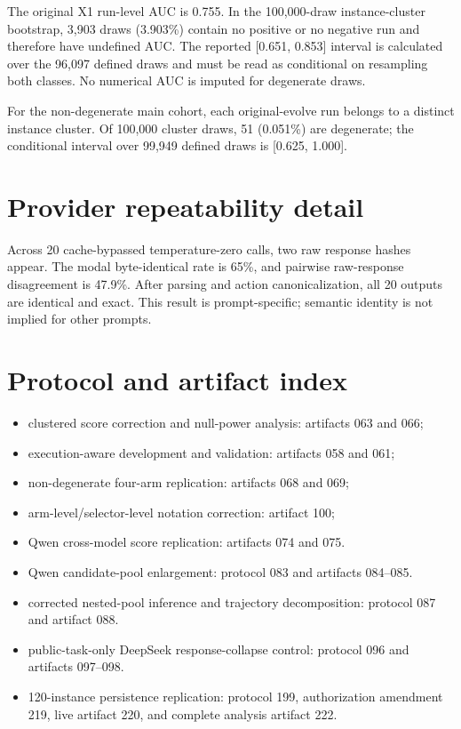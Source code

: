 The original X1 run-level AUC is 0.755. In the 100,000-draw instance-cluster bootstrap, 3,903 draws (3.903\%) contain no positive or no negative run and therefore have undefined AUC. The reported [0.651, 0.853] interval is calculated over the 96,097 defined draws and must be read as conditional on resampling both classes. No numerical AUC is imputed for degenerate draws.

For the non-degenerate main cohort, each original-evolve run belongs to a distinct instance cluster. Of 100,000 cluster draws, 51 (0.051\%) are degenerate; the conditional interval over 99,949 defined draws is [0.625, 1.000].

\section{Provider repeatability detail}

Across 20 cache-bypassed temperature-zero calls, two raw response hashes appear. The modal byte-identical rate is 65\%, and pairwise raw-response disagreement is 47.9\%. After parsing and action canonicalization, all 20 outputs are identical and exact. This result is prompt-specific; semantic identity is not implied for other prompts.

\section{Protocol and artifact index}

\begin{itemize}
  \item clustered score correction and null-power analysis: artifacts 063 and 066;
  \item execution-aware development and validation: artifacts 058 and 061;
  \item non-degenerate four-arm replication: artifacts 068 and 069;
  \item arm-level/selector-level notation correction: artifact 100;
  \item Qwen cross-model score replication: artifacts 074 and 075.
  \item Qwen candidate-pool enlargement: protocol 083 and artifacts 084--085.
  \item corrected nested-pool inference and trajectory decomposition: protocol 087 and artifact 088.
  \item public-task-only DeepSeek response-collapse control: protocol 096 and artifacts 097--098.
  \item 120-instance persistence replication: protocol 199, authorization amendment 219, live artifact 220, and complete analysis artifact 222.
\end{itemize}

